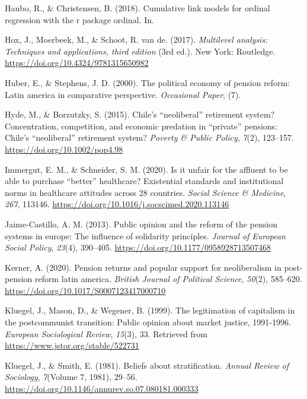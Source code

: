\documentclass[
  12pt,
]{article}
\newlength{\cslhangindent}
\newenvironment{CSLReferences}[2] %
 {\begin{list}{}{%
  \setlength{\itemindent}{0pt}
  \setlength{\leftmargin}{0pt}
  \setlength{\parsep}{0pt}
  \ifodd #1
   \setlength{\leftmargin}{\cslhangindent}
   \setlength{\itemindent}{-1\cslhangindent}
  \fi
  \setlength{\itemsep}{#2\baselineskip}}}
 {\end{list}}
\begin{document}
\begin{CSLReferences}{1}{0}
Haubo, R., \& Christensen, B. (2018). Cumulative link models for ordinal
regression with the r package ordinal. In.

Hox, J., Moerbeek, M., \& Schoot, R. van de. (2017). \emph{Multilevel
analysis: Techniques and applications, third edition} (3rd ed.). New
York: Routledge. \url{https://doi.org/10.4324/9781315650982}

Huber, E., \& Stephens, J. D. (2000). The political economy of pension
reform: Latin america in comparative perspective. \emph{Occasional
Paper}, (7).

Hyde, M., \& Borzutzky, S. (2015). Chile's {``neoliberal''} retirement
system? Concentration, competition, and economic predation in
{``private''} pensions: Chile's {``neoliberal''} retirement system?
\emph{Poverty \& Public Policy}, \emph{7}(2), 123--157.
\url{https://doi.org/10.1002/pop4.98}

Immergut, E. M., \& Schneider, S. M. (2020). Is it unfair for the
affluent to be able to purchase {``better''} healthcare? Existential
standards and institutional norms in healthcare attitudes across 28
countries. \emph{Social Science \& Medicine}, \emph{267}, 113146.
\url{https://doi.org/10.1016/j.socscimed.2020.113146}

Jaime-Castillo, A. M. (2013). Public opinion and the reform of the
pension systems in europe: The influence of solidarity principles.
\emph{Journal of European Social Policy}, \emph{23}(4), 390--405.
\url{https://doi.org/10.1177/0958928713507468}

Kerner, A. (2020). Pension returns and popular support for neoliberalism
in post-pension reform latin america. \emph{British Journal of Political
Science}, \emph{50}(2), 585--620.
\url{https://doi.org/10.1017/S0007123417000710}

Kluegel, J., Mason, D., \& Wegener, B. (1999). The legitimation of
capitalism in the postcommunist transition: Public opinion about market
justice, 1991-1996. \emph{European Sociological Review}, \emph{15}(3),
33. Retrieved from \url{https://www.jstor.org/stable/522731}

Kluegel, J., \& Smith, E. (1981). Beliefs about stratification.
\emph{Annual Review of Sociology}, \emph{7}(Volume 7, 1981), 29--56.
\url{https://doi.org/10.1146/annurev.so.07.080181.000333}


\end{CSLReferences}
\end{document}
